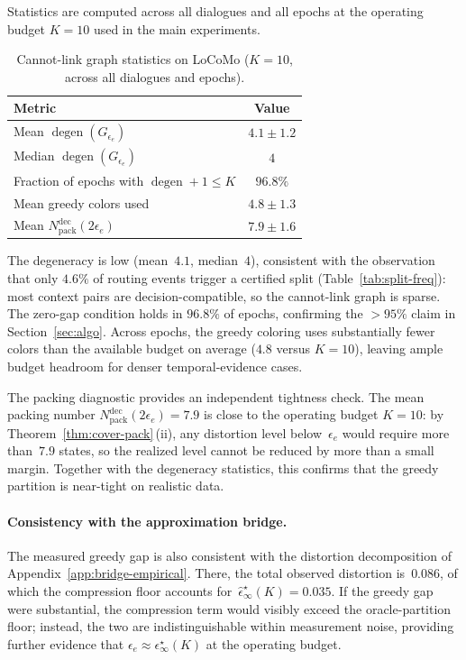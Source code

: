 \documentclass{article}
\DeclareMathOperator{\degen}{degen}
\theoremstyle{plain}
\theoremstyle{definition}
\theoremstyle{remark}
\newcommand{\eps}{\epsilon}
\begin{document}
Statistics are computed across all dialogues and all epochs at the
operating budget $K=10$ used in the main experiments.

\begin{table}[h]
\centering
\caption{Cannot-link graph statistics on LoCoMo ($K=10$, across all
  dialogues and epochs).}
\label{tab:greedy-gap-locomo}
\begin{tabular}{lc}
\toprule
Metric & Value \\
\midrule
Mean $\degen(G_{\eps_e})$
  & $4.1\pm1.2$ \\
Median $\degen(G_{\eps_e})$
  & $4$ \\
Fraction of epochs with $\degen+1\le K$
  & $96.8\%$ \\
Mean greedy colors used
  & $4.8\pm1.3$ \\
Mean $N^{\mathrm{dec}}_{\mathrm{pack}}(2\eps_e)$
  & $7.9\pm1.6$ \\
\bottomrule
\end{tabular}
\end{table}

The degeneracy is low (mean~$4.1$, median~$4$), consistent with the
observation that only $4.6\%$ of routing events trigger a certified
split (Table~\ref{tab:split-freq}): most context pairs are
decision-compatible, so the cannot-link graph is sparse.
The zero-gap condition holds in $96.8\%$ of epochs, confirming the
$>95\%$ claim in Section~\ref{sec:algo}.
Across epochs, the greedy coloring uses substantially fewer colors than the
available budget on average ($4.8$ versus $K=10$), leaving ample budget headroom
for denser temporal-evidence cases.

The packing diagnostic provides an independent tightness check.
The mean packing number $N^{\mathrm{dec}}_{\mathrm{pack}}(2\eps_e)
= 7.9$ is close to the operating budget $K=10$: by
Theorem~\ref{thm:cover-pack}\,(ii), any distortion level
below~$\eps_e$ would require more than~$7.9$ states, so the
realized level cannot be reduced by more than a small margin.
Together with the degeneracy statistics, this confirms that the
greedy partition is near-tight on realistic data.

\paragraph{Consistency with the approximation bridge.}
The measured greedy gap is also consistent with the distortion
decomposition of Appendix~\ref{app:bridge-empirical}.
There, the total observed distortion is~$0.086$, of which the
compression floor accounts for~$\hat\eps^\star_\infty(K)=0.035$.
If the greedy gap were substantial, the compression term would
visibly exceed the oracle-partition floor; instead, the two are
indistinguishable within measurement noise, providing further
evidence that $\eps_e\approx\eps^\star_\infty(K)$ at the operating
budget.
\end{document}
